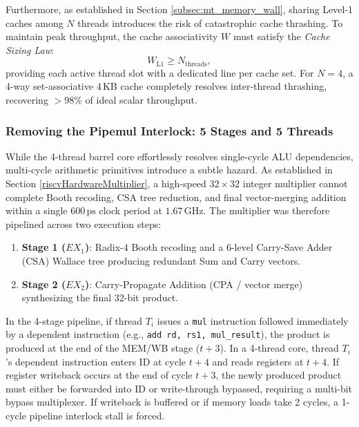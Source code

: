 Furthermore, as established in Section \ref{subsec:mt_memory_wall}, sharing Level-1 caches among $N$ threads introduces the risk of catastrophic cache thrashing. To maintain peak throughput, the cache associativity $W$ must satisfy the \textit{Cache Sizing Law}:
\begin{equation}
W_{\text{L1}} \ge N_{\text{threads}},
\end{equation}
providing each active thread slot with a dedicated line per cache set. For $N = 4$, a 4-way set-associative $4\,\text{KB}$ cache completely resolves inter-thread thrashing, recovering $>98\%$ of ideal scalar throughput.

\subsubsection{Removing the Pipemul Interlock: 5 Stages and 5 Threads}
While the 4-thread barrel core effortlessly resolves single-cycle ALU dependencies, multi-cycle arithmetic primitives introduce a subtle hazard. As established in Section \ref{riscvHardwareMultiplier}, a high-speed $32 \times 32$ integer multiplier cannot complete Booth recoding, CSA tree reduction, and final vector-merging addition within a single $600\,\text{ps}$ clock period at $1.67\,\text{GHz}$. The multiplier was therefore pipelined across two execution steps:
\begin{enumerate}
    \item \textbf{Stage 1 ($EX_1$)}: Radix-4 Booth recoding and a 6-level Carry-Save Adder (CSA) Wallace tree producing redundant Sum and Carry vectors.
    \item \textbf{Stage 2 ($EX_2$)}: Carry-Propagate Addition (CPA / vector merge) synthesizing the final 32-bit product.
\end{enumerate}
In the 4-stage pipeline, if thread $T_i$ issues a \texttt{mul} instruction followed immediately by a dependent instruction (e.g., \texttt{add rd, rs1, mul\_result}), the product is produced at the end of the MEM/WB stage ($t+3$). In a 4-thread core, thread $T_i$'s dependent instruction enters ID at cycle $t+4$ and reads registers at $t+4$. If register writeback occurs at the end of cycle $t+3$, the newly produced product must either be forwarded into ID or write-through bypassed, requiring a multi-bit bypass multiplexer. If writeback is buffered or if memory loads take 2 cycles, a 1-cycle pipeline interlock stall is forced.


